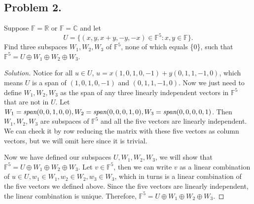 \documentclass{article}
\begin{document}
\subsection*{Problem 2.}
Suppose $\mathbb{F}=\mathbb{R}$ or $\mathbb{F} = \mathbb{C}$ and let 
$$U = \{(x,y,x+y,-y,-x)\in\mathbb{F}^5:x,y\in\mathbb{F}\}.$$
Find three subspaces $W_1, W_2, W_3$ of $\mathbb{F}^5$, none of which equals \{0\}, such that 
$\mathbb{F}^5=U\oplus W_1\oplus W_2\oplus W_3$.
\begin{proof}[Solution]
    Notice for all $u\in U$, $u = x(1, 0, 1, 0, -1) + y(0, 1, 1, -1, 0)$, which means $U$ is a span 
    of $(1, 0, 1, 0, -1)$ and $(0, 1, 1, -1, 0)$. Now we just need to define $W_1, W_2, W_3$ as 
    the span of any three linearly independent vectors in $\mathbb{F}^5$ that are not in $U$. 
    Let $W_1 = \emph{span}(0, 0, 1, 0, 0), W_2 = \emph{span}(0, 0, 0, 1, 0), W_3 = 
    \emph{span}(0, 0, 0, 0, 1)$. Then $W_1, W_2, W_3$ are subspaces of $\mathbb{F}^5$ and 
    all the five vectors are linearly independent. We can check it by row reducing the matrix 
    with these five vectors as column vectors, but we will omit here since it is trivial.

    Now we have defined our subspaces $U, W_1, W_2, W_3$, we will show that $\mathbb{F}^5 = 
    U\oplus W_1\oplus W_2\oplus W_3$. Let $v \in \mathbb{F}^5$, then we can write $v$ as a linear 
    combination of $u\in U, w_1\in W_1, w_2\in W_2, w_3\in W_3$, which in turns is 
    a linear combination of the five vectors we defined above. Since the five vectors are linearly 
    independent, the linear combination is unique. Therefore, $\mathbb{F}^5 = U\oplus W_1\oplus 
    W_2\oplus W_3$.
\end{proof}
\end{document}
